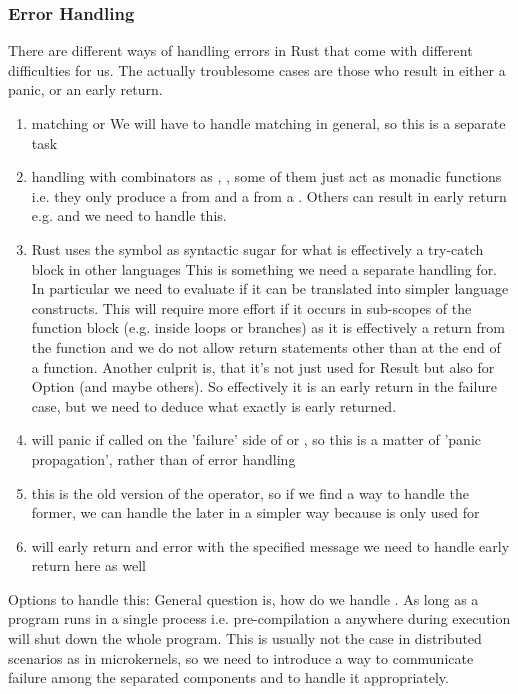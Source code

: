 \subsubsection{Error Handling} 
There are different ways of handling errors in Rust that come with different difficulties for us. The actually troublesome cases are those who result in either a panic, or an early return. 
    \begin{enumerate}
        \item matching  or  \means We will have to handle matching in general, so this is a separate task
        \item handling with combinators as ,  ,  \means some of them just act as monadic functions i.e. they only produce a  from  and a  from a . Others can result in early return e.g.  and we need to handle this.
        \item Rust uses the  symbol as syntactic sugar for what is effectively a try-catch block in other languages \means This is something we need a separate handling for. In particular we need to evaluate if it can be translated into simpler language constructs. This will require more effort if it occurs in sub-scopes of the function block (e.g. inside loops or branches) as it is effectively a return from the function and we do not allow return statements other than at the end of a function. Another culprit is, that it's not just used for Result but also for Option (and maybe others). So effectively it is an early return in the failure case, but we need to deduce what exactly is early returned. 
        \item {} \means will panic if called on the 'failure' side of  or , so this is a matter of 'panic propagation', rather than of error handling
        \item {} \means this is the old version of the  operator, so if we find a way to handle the former, we can handle the later in a simpler way because  is only used for 
        \item {} will early return and error with the specified message \means we need to handle early return here as well
    \end{enumerate}
    
Options to handle this: 
General question is, how do we handle . As long as a program runs in a single process i.e. pre-compilation a  anywhere during execution will shut down the whole program. This is usually not the case in distributed scenarios as in microkernels, so we need to introduce a way to communicate failure among the separated components and to handle it appropriately.

